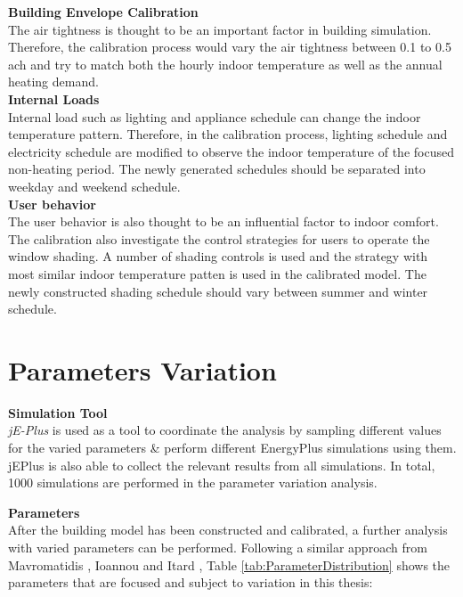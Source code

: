 \documentclass[a4paper, oneside]{discothesis}
\begin{document}
		

		\textbf{Building Envelope Calibration}\\
			The air tightness is thought to be an important factor in building simulation. Therefore, the calibration process would vary the air tightness between 0.1 to 0.5 ach and try to match both the hourly indoor temperature as well as the annual heating demand.\\


		\textbf{Internal Loads}\\
			Internal load such as lighting and appliance schedule can change the indoor temperature pattern. Therefore, in the calibration process, lighting schedule and electricity schedule are modified to observe the indoor temperature of the focused non-heating period. The newly generated schedules should be separated into weekday and weekend schedule.\\


		\textbf{User behavior}\\
			The user behavior is also thought to be an influential factor to indoor comfort. The calibration also investigate the control strategies for users to operate the window shading. A number of shading controls is used and the strategy with most similar indoor temperature patten is used in the calibrated model. The newly constructed shading schedule should vary between summer and winter schedule.\\


	\section{Parameters Variation}
		
		\textbf{Simulation Tool}\\
		\textit{jE-Plus} is used as a tool to coordinate the analysis by sampling different values for the varied parameters \& perform different EnergyPlus simulations using them. jEPlus is also able to collect the relevant results from all simulations. In total, 1000 simulations are performed in the parameter variation analysis.\\
		
		\par
		\textbf{Parameters}\\
		After the building model has been constructed and calibrated, a further analysis with varied parameters can be performed. Following a similar approach from Mavromatidis \cite{GeorgeThesis}, Ioannou and Itard \cite{ioannou2015energy}, Table \ref{tab:ParameterDistribution} shows the parameters that are focused and subject to variation in this thesis:\\
\end{document}

